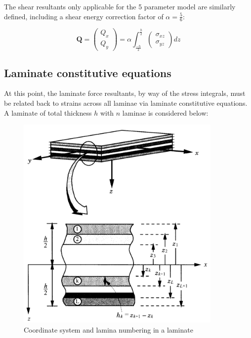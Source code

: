 The shear resultants only applicable for the 5 parameter model are similarly defined, including a shear energy correction factor of $\alpha = \frac{5}{6}$:

\begin{equation} 
\mathbf{Q} = 
\begin{pmatrix}
Q_{x} \\
Q_{y} 
\end{pmatrix}
= \alpha
{\int_{\frac{-h}{2}}^{\frac{h}{2}}
	\begin{pmatrix}
	\sigma_{xz} \\
	\sigma_{yz} 
	\end{pmatrix}}
dz
\label{eqscomp_force_resultants2}
\end{equation}

\subsection{Laminate constitutive equations}

At this point, the laminate force resultants, by way of the stress integrals, must be related back to strains across all laminae via laminate constitutive equations. A laminate of total thickness $h$ with $n$ laminae is considered below:

\begin{figure}[h!]
	\centering
	\includegraphics[width=10cm]{images/composite_layer_system}
	\caption{Coordinate system and lamina numbering in a laminate \cite{reddy2004mechanics}}
	\label{fig:compositelayersystem}
\end{figure}

